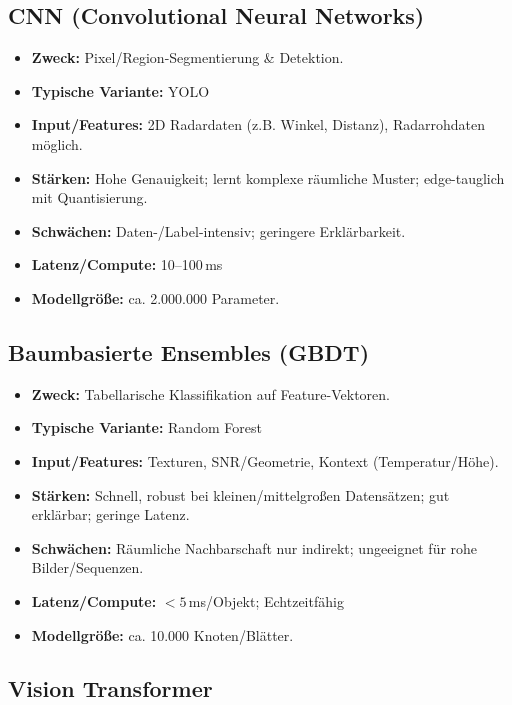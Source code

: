 \subsection*{CNN (Convolutional Neural Networks)} 
\begin{itemize}
  \item \textbf{Zweck:} Pixel/Region-Segmentierung \& Detektion.
  \item \textbf{Typische Variante:} YOLO
  \item \textbf{Input/Features:} 2D Radardaten (z.B. Winkel, Distanz), Radarrohdaten möglich.
  \item \textbf{Stärken:} Hohe Genauigkeit; lernt komplexe räumliche Muster; edge-tauglich mit  Quantisierung.
  \item \textbf{Schwächen:} Daten-/Label-intensiv; geringere Erklärbarkeit.
  \item \textbf{Latenz/Compute:} 10--100\,ms
  \item \textbf{Modellgröße:} ca. 2.000.000 Parameter.
\end{itemize}

\subsection*{Baumbasierte Ensembles (GBDT)}
\begin{itemize}
  \item \textbf{Zweck:} Tabellarische Klassifikation auf Feature-Vektoren.
  \item \textbf{Typische Variante:} Random Forest
  \item \textbf{Input/Features:} Texturen, SNR/Geometrie, Kontext (Temperatur/Höhe).
  \item \textbf{Stärken:} Schnell, robust bei kleinen/mittelgroßen Datensätzen; gut erklärbar; geringe Latenz.
  \item \textbf{Schwächen:} Räumliche Nachbarschaft nur indirekt; ungeeignet für rohe Bilder/Sequenzen.
  \item \textbf{Latenz/Compute:} $< 5$\,ms/Objekt; Echtzeitfähig
  \item \textbf{Modellgröße:} ca. 10.000 Knoten/Blätter.
\end{itemize}

\subsection*{Vision Transformer}

